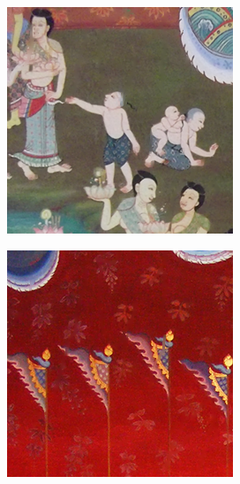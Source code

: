 \documentclass[xcolor=dvipsnames, xetex,serif]{beamer}
\begin{document}
\begin{frame}
\begin{figure}[H]
\begin{subfigure}{0.15\linewidth}
            \end{subfigure}
            \begin{subfigure}{0.15\linewidth}
                \centering
                \includegraphics[width=0.9\linewidth]{images/result_ex4/multisplitbergman_case02.png}
            \end{subfigure}
            \begin{subfigure}{0.15\linewidth}
                \centering
                \includegraphics[width=0.9\linewidth]{images/result_ex4/multisplitbergman_case03.png}			

\end{subfigure}
\end{figure}
\end{frame}
\end{document}
